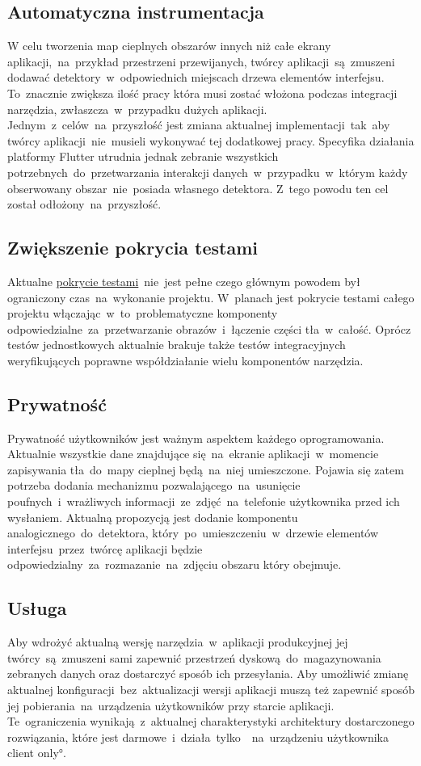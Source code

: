 \subsection{Automatyczna instrumentacja}
\label{sec:auto_instrumentation}
W celu tworzenia map cieplnych obszarów innych niż całe ekrany aplikacji,~na~przykład przestrzeni przewijanych, twórcy aplikacji~są~zmuszeni dodawać detektory~w~odpowiednich miejscach drzewa elementów interfejsu. To~znacznie zwiększa ilość pracy która musi zostać włożona podczas integracji narzędzia, zwłaszcza~w~przypadku dużych aplikacji. Jednym~z~celów~na~przyszłość jest zmiana aktualnej implementacji~tak~aby twórcy aplikacji~nie~musieli wykonywać tej dodatkowej pracy. Specyfika działania platformy Flutter utrudnia jednak zebranie wszystkich potrzebnych~do~przetwarzania interakcji danych~w~przypadku~w~którym każdy obserwowany obszar~nie~posiada własnego detektora. Z~tego powodu ten cel został odłożony~na~przyszłość.

\subsection{Zwiększenie pokrycia testami}
\label{sec:future_coverage}
Aktualne \hyperref[par:test_coverage]{pokrycie testami}~nie~jest pełne czego głównym powodem był ograniczony czas~na~wykonanie projektu. W~planach jest pokrycie testami całego projektu włączając~w~to~problematyczne komponenty odpowiedzialne~za~przetwarzanie obrazów~i~łączenie części tła~w~całość. Oprócz testów jednostkowych aktualnie brakuje także testów integracyjnych weryfikujących poprawne współdziałanie wielu komponentów narzędzia.

\subsection{Prywatność}
Prywatność użytkowników jest ważnym aspektem każdego oprogramowania. Aktualnie wszystkie dane znajdujące się~na~ekranie aplikacji~w~momencie zapisywania tła~do~mapy cieplnej będą~na~niej umieszczone. Pojawia się zatem potrzeba dodania mechanizmu pozwalającego~na~usunięcie poufnych~i~wrażliwych informacji~ze~zdjęć~na~telefonie użytkownika przed ich wysłaniem. Aktualną propozycją jest dodanie komponentu analogicznego~do~detektora, który~po~umieszczeniu~w~drzewie elementów interfejsu~przez~twórcę aplikacji będzie odpowiedzialny~za~rozmazanie~na~zdjęciu obszaru który obejmuje.

\subsection{Usługa}
Aby wdrożyć aktualną wersję narzędzia~w~aplikacji produkcyjnej jej twórcy~są~zmuszeni sami zapewnić przestrzeń dyskową~do~magazynowania zebranych danych oraz dostarczyć sposób ich przesyłania. Aby umożliwić zmianę aktualnej konfiguracji~bez~aktualizacji wersji aplikacji muszą też zapewnić sposób jej pobierania~na~urządzenia użytkowników przy starcie aplikacji. Te~ograniczenia wynikają~z~aktualnej charakterystyki architektury dostarczonego rozwiązania, które jest darmowe~i~działa~tylko~~na~urządzeniu użytkownika \ang{client only}.

